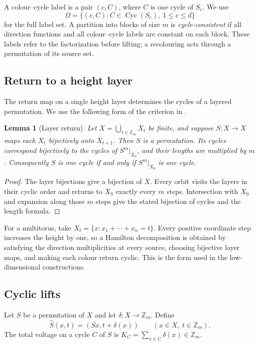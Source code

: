 \documentclass[11pt,reqno]{amsart}
\numberwithin{equation}{section}
\newtheorem{lemma}[theorem]{Lemma}
\theoremstyle{definition}
\theoremstyle{remark}
\newcommand{\Zm}{\mathbb Z_m}
\newcommand{\cO}{\Omega}
\begin{document}
A colour--cycle label is a pair $(c,C)$, where $C$ is one cycle of $S_c$. We use
\begin{equation}\label{eq:orbit-set}
 \cO=\{(c,C):C\in\operatorname{Cyc}(S_c),\ 1\le c\le d\}
\end{equation}
for the full label set. A partition into blocks of size $m$ is
\emph{cycle-consistent} if all direction functions and all colour--cycle
labels are constant on each block. These labels refer to the factorization before lifting; a recolouring
acts through a permutation of its source set.

\subsection{Return to a height layer}
The return map on a single height layer determines the cycles of a
layered permutation. We use the following form of the criterion in
\cite[Theorem~3.2]{ParkVtwo}.

\begin{lemma}[Layer return]\label{lem:layer-return}
Let $X=\dot\bigcup_{t\in\Zm}X_t$ be finite, and suppose
$S:X\to X$ maps each $X_t$ bijectively onto $X_{t+1}$.
Then $S$ is a permutation. Its cycles correspond bijectively to the cycles
of $S^m|_{X_0}$, and their lengths are multiplied by $m$.
Consequently $S$ is one cycle if and only if $S^m|_{X_0}$ is one cycle.
\end{lemma}
\begin{proof}
The layer bijections give a bijection of $X$. Every orbit visits the layers
in their cyclic order and returns to $X_0$ exactly every $m$ steps.
Intersection with $X_0$ and expansion along those $m$ steps give the stated
bijection of cycles and the length formula.
\end{proof}

For a multitorus, take $X_t=\{x:x_1+\cdots+x_n=t\}$. Every positive
coordinate step increases the height by one, so a Hamilton decomposition
is obtained by satisfying the direction multiplicities at every source,
choosing bijective layer maps, and making each colour return cyclic.
This is the form used in the low-dimensional constructions.

\subsection{Cyclic lifts}
Let $S$ be a permutation of $X$ and let $\delta:X\to\Zm$. Define
\[
 \widehat S(x,t)=(Sx,t+\delta(x))\qquad(x\in X,\ t\in\Zm).
\]
The total voltage on a cycle $C$ of $S$ is
$K_C=\sum_{x\in C}\delta(x)\in\Zm$.
\end{document}

